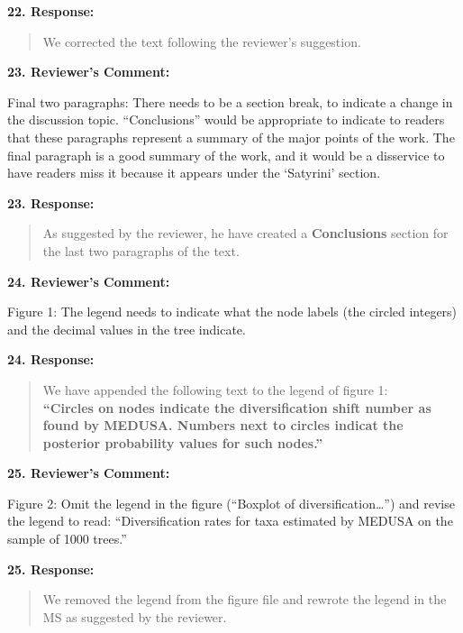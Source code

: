 \documentclass[]{article}
\begin{document}
\textbf{22. Response:}

\begin{quote}
\color{blue}
\color{blue}
\color{blue}
We corrected the text following the reviewer's suggestion.
\end{quote}

\textbf{23. Reviewer's Comment:}

Final two paragraphs: There needs to be a section break, to indicate a
change in the discussion topic. ``Conclusions'' would be appropriate to
indicate to readers that these paragraphs represent a summary of the
major points of the work. The final paragraph is a good summary of the
work, and it would be a disservice to have readers miss it because it
appears under the `Satyrini' section.

\textbf{23. Response:}

\begin{quote}
\color{blue}
\color{blue}
\color{blue}
As suggested by the reviewer, he have created a \textbf{Conclusions}
section for the last two paragraphs of the text.
\end{quote}

\textbf{24. Reviewer's Comment:}

Figure 1: The legend needs to indicate what the node labels (the circled
integers) and the decimal values in the tree indicate.

\textbf{24. Response:}

\begin{quote}
\color{blue}
\color{blue}
\color{blue}
We have appended the following text to the legend of figure
1:\\\textbf{``Circles on nodes indicate the diversification shift number
as found by MEDUSA. Numbers next to circles indicat the posterior
probability values for such nodes.''}
\end{quote}

\textbf{25. Reviewer's Comment:}

Figure 2: Omit the legend in the figure (``Boxplot of
diversification\ldots{}'') and revise the legend to read:
``Diversification rates for taxa estimated by MEDUSA on the sample of
1000 trees.''

\textbf{25. Response:}

\begin{quote}
\color{blue}
\color{blue}
\color{blue}
We removed the legend from the figure file and rewrote the legend in the
MS as suggested by the reviewer.
\end{quote}
\end{document}
